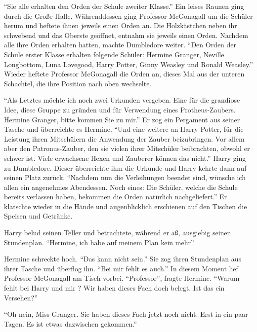 \enquote{Sie alle erhalten den Orden der Schule zweiter Klasse.} Ein leises Raunen ging durch die Große Halle. Währenddessen ging Professor McGonagall um die Schüler herum und heftete ihnen jeweils einen Orden an. Die Holzkästchen neben ihr schwebend und das Oberste geöffnet, entnahm sie jeweils einen Orden. Nachdem alle ihre Orden erhalten hatten, machte Dumbledore weiter. \enquote{Den Orden der Schule erster Klasse erhalten folgende Schüler: Hermine Granger, Neville Longbottom, Luna Lovegood, Harry Potter, Ginny Weasley und Ronald Weasley.} Wieder heftete Professor McGonagall die Orden an, dieses Mal aus der unteren Schachtel, die ihre Position nach oben wechselte.

\enquote{Als Letztes möchte ich noch zwei Urkunden vergeben. Eine für die grandiose Idee, diese Gruppe zu gründen und für Verwendung eines Protheus-Zaubers. Hermine Granger, bitte kommen Sie zu mir.} Er zog ein Pergament aus seiner Tasche und überreichte es Hermine. \enquote{Und eine weitere an Harry Potter, für die Leistung ihren Mitschülern die Anwendung der Zauber beizubringen. Vor allem aber den Patronus-Zauber, den sie vielen ihrer Mitschüler beibrachten, obwohl er schwer ist. Viele erwachsene Hexen und Zauberer können das nicht.} Harry ging zu Dumbledore. Dieser überreichte ihm die Urkunde und Harry kehrte dann auf seinen Platz zurück. \enquote{Nachdem nun die Verleihungen beendet sind, wünsche ich allen ein angenehmes Abendessen. \gst Noch eines: Die Schüler, welche die Schule bereits verlassen haben, bekommen die Orden natürlich nachgeliefert.} Er klatschte wieder in die Hände und augenblicklich erschienen auf den Tischen die Speisen und Getränke.

Harry belud seinen Teller und betrachtete, während er aß, ausgiebig seinen Stundenplan.  \enquote{Hermine, ich habe auf meinem Plan kein  mehr}.

Hermine schreckte hoch. \enquote{Das kann nicht sein.} Sie zog ihren Stundenplan aus ihrer Tasche und überflog ihn. \enquote{Bei mir fehlt es auch.} In diesem Moment lief Professor McGonagall am Tisch vorbei. \enquote{Professor}, fragte Hermine. \enquote{Warum fehlt bei Harry und mir ? Wir haben dieses Fach doch belegt. Ist das ein Versehen?}

\enquote{Oh nein, Miss Granger. Sie haben dieses Fach jetzt noch nicht. Erst in ein paar Tagen. Es ist etwas dazwischen gekommen.}

